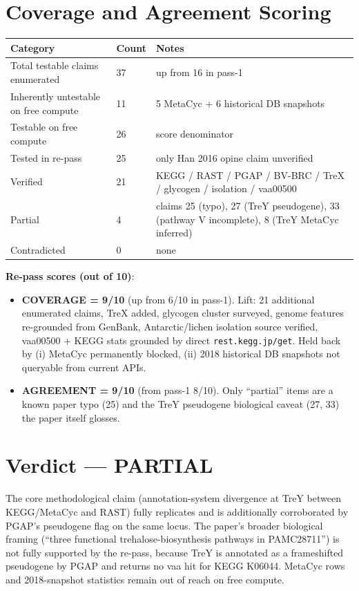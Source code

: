 \documentclass[11pt,letterpaper]{article}
\begin{document}
\section{Coverage and Agreement Scoring}
\begin{tabularx}{\linewidth}{@{}l l X@{}}
\toprule
Category & Count & Notes \\
\midrule
Total testable claims enumerated       & 37 & up from 16 in pass-1 \\
Inherently untestable on free compute  & 11 & 5 MetaCyc + 6 historical DB snapshots \\
Testable on free compute               & 26 & score denominator \\
Tested in re-pass                      & 25 & only Han 2016 opine claim unverified \\
Verified                               & 21 & KEGG / RAST / PGAP / BV-BRC / TreX / glycogen / isolation / vaa00500 \\
Partial                                & 4  & claims 25 (typo), 27 (TreY pseudogene), 33 (pathway V incomplete), 8 (TreY MetaCyc inferred) \\
Contradicted                           & 0  & none \\
\bottomrule
\end{tabularx}

\medskip
\noindent\textbf{Re-pass scores (out of 10)}:
\begin{itemize}[leftmargin=1.2em,itemsep=1pt]
  \item \textbf{COVERAGE = 9/10} (up from 6/10 in pass-1). Lift: 21 additional enumerated claims, TreX added, glycogen cluster surveyed, genome features re-grounded from GenBank, Antarctic/lichen isolation source verified, vaa00500 + KEGG stats grounded by direct \texttt{rest.kegg.jp/get}. Held back by (i) MetaCyc permanently blocked, (ii) 2018 historical DB snapshots not queryable from current APIs.
  \item \textbf{AGREEMENT = 9/10} (from pass-1 8/10). Only ``partial'' items are a known paper typo (25) and the TreY pseudogene biological caveat (27, 33) the paper itself glosses.
\end{itemize}

\section{Verdict --- PARTIAL}
The core methodological claim (annotation-system divergence at TreY between KEGG/MetaCyc and RAST) fully replicates and is additionally corroborated by PGAP's pseudogene flag on the same locus. The paper's broader biological framing (``three functional trehalose-biosynthesis pathways in PAMC28711'') is not fully supported by the re-pass, because TreY is annotated as a frameshifted pseudogene by PGAP and returns no vaa hit for KEGG K06044. MetaCyc rows and 2018-snapshot statistics remain out of reach on free compute.
\end{document}
